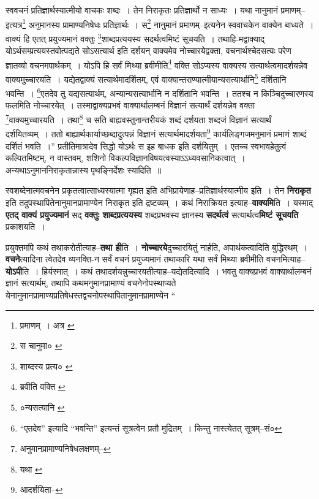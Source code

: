 \documentclass[article,12pt,a4paper]{memoir}
\begin{document}
	स्ववचनं प्रतिज्ञार्थस्यात्मीयो वाचकः शब्दः । तेन निराकृतः प्रतिज्ञार्थो न साध्यः । यथा नानुमानं प्रमाणम्--इत्यत्र\footnote{प्रमाणम् । अत्र \cite{dp-msA} \cite{dp-msB} \cite{dp-msD} \cite{dp-edP} \cite{dp-edH} \cite{dp-edE} \cite{dp-edN}} अनुमानस्य प्रामाण्यनिषेधः प्रतिज्ञार्थः । स\footnote{स चानुमा० \cite{dp-msC}} नानुमानं प्रमाणम्--इत्यनेन स्ववाचकेन वाक्येन बाध्यते । वाक्यं हि एतत् प्रयुज्यमानं वक्तुः \footnote{शाब्दस्य प्रत्य० \cite{dp-msA} \cite{dp-msB} \cite{dp-msC} \cite{dp-msD} \cite{dp-edP} \cite{dp-edH} \cite{dp-edE} \cite{dp-edN}}\-शाब्दप्रत्ययस्य सदर्थत्वमिष्टं सूचयति । तथाहि-मद्वाक्याद् योऽर्थसम्प्रत्ययस्तवोत्पद्यते सोऽसत्यार्थ इति दर्शयन् वाक्यमेव नोच्चारयेद्वक्ता, वचनार्थश्चेदसत्यः परेण ज्ञातव्यो वचनमपार्थकम् । योऽपि हि सर्वं मिथ्या ब्रवीमीति\footnote{ब्रवीति वक्ति \cite{dp-msB}} वक्ति सोऽप्यस्य वाक्यस्य सत्यार्थत्वमादर्शयन्नेव वाक्यमुच्चारयति । यद्येतद्वाक्यं सत्यार्थमादर्शितम्, एवं वाक्यान्तराण्यात्मीयान्यसत्यार्थानि\footnote{०न्यसत्यानि \cite{dp-msA}} दर्शितानि भवन्ति । \footnote{“एतदेव” इत्यादि “भवन्ति” इत्यन्तं सूत्रत्वेन \cite{dp-edH} प्रतौ मुद्रितम् । किन्तु नास्त्येतत् सूत्रम्--सं०}\-एतदेव तु यद्यसत्यार्थम्, अन्यान्यसत्यार्भानि न दर्शितानि भवन्ति । ततश्च न किञ्चिदुच्चारणस्य फलमिति नोच्चारयेत् । तस्माद्वाक्यप्रभवं वाक्यार्थालम्बनं विज्ञानं सत्यार्थं दर्शयन्नेव वक्ता \footnote{अनुमानप्रामाण्यनिषेधलक्षणम्--\cite{dp-msD-n}}\-वाक्यमुच्चारयति । तथा\footnote{यथा \cite{dp-msA}} च सति बाह्यवस्तुनान्तरीयकं शब्दं दर्शयता शब्दजं विज्ञानं सत्यार्थं दर्शयितव्यम् । ततो बाह्यार्थकार्याच्छब्दादुत्पन्नं विज्ञानं सत्यार्थमादर्शयता\footnote{आदर्शयिता--\cite{dp-msA}} कार्यलिङ्गजमनुमानं प्रमाणं शाब्दं दर्शितं भवति ।” प्रतीतिमात्रादेव सिद्धो योऽर्थः स इह बाधक इति दर्शयितुम् । एतच्च स्वभावहेतुत्वं कल्पितमिष्टम्, न वास्तवम्, शशिनो विकल्पविज्ञानविषयत्वस्याऽऽध्यवसानिकत्वात् । अन्यथाऽनुमाननिराकृतान्नास्य पृथङ्निर्देशः स्यादिति ॥
	\pend
      

	  \pstart स्वशब्देनात्मवचनेन प्रकृतत्वात्साध्यस्यात्मा गृह्यत इति अभिप्रायेणाह--प्रतिज्ञार्थस्यात्मीय इति । तेन \textbf{निराकृत} इति तदुपस्थापितेनानुमानप्रामाण्येन निराकृत इति द्रष्टव्यम् । कथं निराक्रियत इत्याह--\textbf{वाक्यमि}ति । यस्माद् \textbf{एतद् वाक्यं प्रयुज्यमानं} सद् \textbf{वक्तुः शाब्दप्रत्ययस्य} शब्दप्रभवस्य ज्ञानस्य \textbf{सदर्थत्वं} सत्यार्थत्व\textbf{मिष्टं सूचयति} प्रकाशयति ।
	\pend
      

	  \pstart प्रयुक्तमपि कथं तथाकरोतीत्याह--\textbf{तथा ही}ति । \textbf{नोच्चारये}दुच्चारयितुं नार्हति, अपार्थकत्वादिति बुद्धिस्थम् । \textbf{वचने}त्यादिना त्वेतदेव व्यनक्ति-न सर्वं वचनं प्रयुज्यमानं तथाकारि यथा सर्वं मिथ्या ब्रवीमीति वचनमित्याह--\textbf{योऽपी}ति । हिर्यस्मात् । कथं तथादर्शयन्नुच्चारयतीत्याह--यद्येतदित्यादि । भवतु वाक्यप्रभवं वाक्यार्थालम्बनं ज्ञानं सत्यार्थम्, तथापि कथमनुमानप्रामाण्यं वचनेनोपस्थाप्यते येनानुमानप्रामाण्यप्रतिषेधस्तद्वचनोपस्थापितानुमानप्रामाण्येन  \leavevmode{} “
	  
\end{document}
